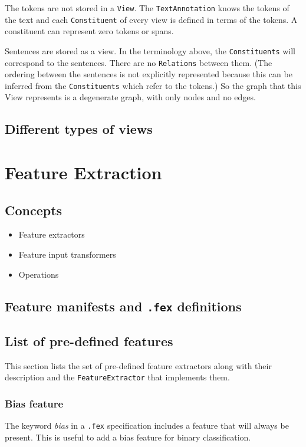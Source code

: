 \documentclass[11pt]{article}
\begin{document}
The tokens are not stored in a \texttt{View}. The \texttt{TextAnnotation} knows the
tokens of the text and each \texttt{Constituent} of every view is defined in
terms of the tokens. A constituent can represent zero tokens or spans.

Sentences are stored as a view. In the terminology above, the
\texttt{Constituents} will correspond to the sentences. There are no
\texttt{Relations} between them. (The ordering between the sentences is not
explicitly represented because this can be inferred from the
\texttt{Constituents} which refer to the tokens.) So the graph that this View
represents is a degenerate graph, with only nodes and no edges.
\subsection{Different types of views}
\label{sec-3-3}
\section{Feature Extraction}
\label{sec-4}
\subsection{Concepts}
\label{sec-4-1}

\begin{itemize}
\item Feature extractors
\item Feature input transformers
\item Operations
\end{itemize}
\subsection{Feature manifests and \texttt{.fex} definitions}
\label{sec-4-2}
\subsection{List of pre-defined features}
\label{sec-4-3}


   This section lists the set of pre-defined feature extractors along
   with their description and the \texttt{FeatureExtractor} that implements
   them.
\subsubsection{Bias feature}
\label{sec-4-3-1}

    The keyword \emph{bias} in a \texttt{.fex} specification includes a feature
    that will always be present. This is useful to add a bias feature
    for binary classification.
\end{document}
